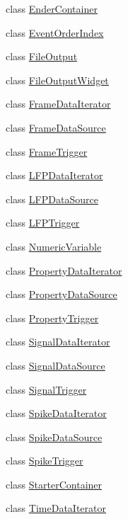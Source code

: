 \begin{DoxyCompactItemize}
\item 
class \hyperlink{class_picto_1_1_ender_container}{Ender\-Container}
\item 
class \hyperlink{class_picto_1_1_event_order_index}{Event\-Order\-Index}
\item 
class \hyperlink{class_picto_1_1_file_output}{File\-Output}
\item 
class \hyperlink{class_picto_1_1_file_output_widget}{File\-Output\-Widget}
\item 
class \hyperlink{class_picto_1_1_frame_data_iterator}{Frame\-Data\-Iterator}
\item 
class \hyperlink{class_picto_1_1_frame_data_source}{Frame\-Data\-Source}
\item 
class \hyperlink{class_picto_1_1_frame_trigger}{Frame\-Trigger}
\item 
class \hyperlink{class_picto_1_1_l_f_p_data_iterator}{L\-F\-P\-Data\-Iterator}
\item 
class \hyperlink{class_picto_1_1_l_f_p_data_source}{L\-F\-P\-Data\-Source}
\item 
class \hyperlink{class_picto_1_1_l_f_p_trigger}{L\-F\-P\-Trigger}
\item 
class \hyperlink{class_picto_1_1_numeric_variable}{Numeric\-Variable}
\item 
class \hyperlink{class_picto_1_1_property_data_iterator}{Property\-Data\-Iterator}
\item 
class \hyperlink{class_picto_1_1_property_data_source}{Property\-Data\-Source}
\item 
class \hyperlink{class_picto_1_1_property_trigger}{Property\-Trigger}
\item 
class \hyperlink{class_picto_1_1_signal_data_iterator}{Signal\-Data\-Iterator}
\item 
class \hyperlink{class_picto_1_1_signal_data_source}{Signal\-Data\-Source}
\item 
class \hyperlink{class_picto_1_1_signal_trigger}{Signal\-Trigger}
\item 
class \hyperlink{class_picto_1_1_spike_data_iterator}{Spike\-Data\-Iterator}
\item 
class \hyperlink{class_picto_1_1_spike_data_source}{Spike\-Data\-Source}
\item 
class \hyperlink{class_picto_1_1_spike_trigger}{Spike\-Trigger}
\item 
class \hyperlink{class_picto_1_1_starter_container}{Starter\-Container}
\item 
class \hyperlink{class_picto_1_1_time_data_iterator}{Time\-Data\-Iterator}

\end{DoxyCompactItemize}
